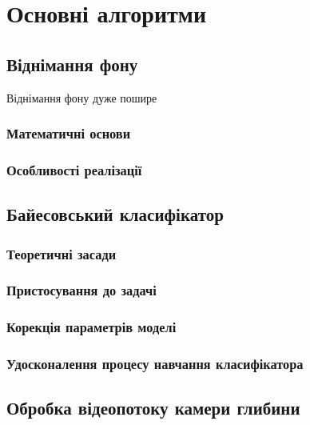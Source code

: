 \section{Основні алгоритми}
\subsection{Віднімання фону}
Віднімання фону дуже пошире
\subsubsection{Математичні основи}
\subsubsection{Особливості реалізації}
\subsection{Байесовський класифікатор}
\subsubsection{Теоретичні засади}
\subsubsection{Пристосування до задачі}
\subsubsection{Корекція параметрів моделі}
\subsubsection{Удосконалення процесу навчання класифікатора}
\subsection{Обробка відеопотоку камери глибини}
